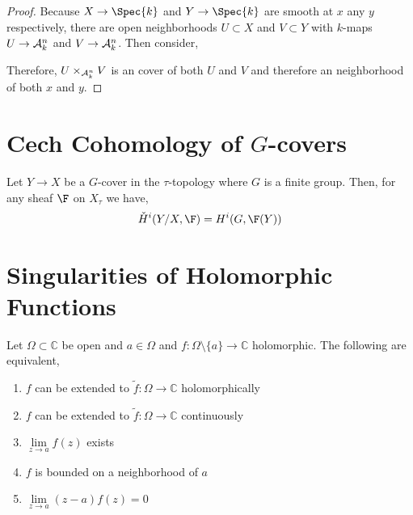 \documentclass[12pt]{article}
\begin{document}
\begin{proof}
Because $X \to \Spec{k}$ and $Y \to \Spec{k}$ are smooth at $x$ any $y$ respectively, there are open neighborhoods $U \subset X$ and $V \subset Y$ with \etale $k$-maps $U \to \mathcal{A}^n_k$ and $V \to \mathcal{A}^n_k$. Then consider,
\begin{center}
\end{center}
Therefore, $U \times_{\mathcal{A}_k^n} V$ is an \etale cover of both $U$ and $V$ and therefore an \etale neighborhood of both $x$ and $y$.
\end{proof}


\section{Cech Cohomology of $G$-covers}

\begin{thm}
Let $Y \to X$ be a $G$-cover in the $\tau$-topology where $G$ is a finite group. Then, for any sheaf $\F$ on $X_{\tau}$ we have,
\[ \check{H}^i(Y/X, \F) = H^i(G, \F(Y)) \]
\end{thm}

\section{Singularities of Holomorphic Functions}

\renewcommand{\C}{\mathbb{C}}
\newcommand{\h}{\mathfrak{H}}


\begin{thm}
Let $\Omega \subset \C$ be open and $a \in \Omega$ and $f : \Omega \setminus \{ a \} \to \C$ holomorphic. The following are equivalent,
\begin{enumerate}
\item $f$ can be extended to $\tilde{f} : \Omega \to \C$ holomorphically
\item $f$ can be extended to $\tilde{f} : \Omega \to \C$ continuously
\item $\lim\limits_{z \to a} f(z)$ exists
\item $f$ is bounded on a neighborhood of $a$
\item $\lim\limits_{z \to a} (z - a) f(z) = 0$
\end{enumerate}
\end{thm}
\end{document}
